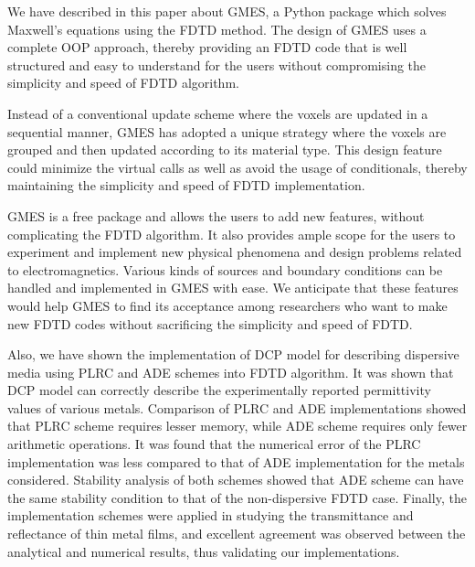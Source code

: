 
We have described in this paper about GMES, a Python package which solves Maxwell's equations using the FDTD method. The design of GMES uses a complete OOP approach, thereby providing an FDTD code that is well structured and easy to understand for the users without compromising the simplicity and speed of FDTD algorithm.

Instead of a conventional update scheme where the voxels are updated in a sequential manner, GMES has adopted a unique strategy where the voxels are grouped and then updated according to its material type. This design feature could minimize the virtual calls as well as avoid the usage of conditionals, thereby maintaining the simplicity and speed of FDTD implementation. 

GMES is a free package and allows the users to add new features, without complicating the FDTD algorithm. It also  provides ample scope for the users to experiment and implement new physical phenomena and design problems related to electromagnetics. Various kinds of sources and boundary conditions can be handled and implemented in GMES with ease. We anticipate that these features would help GMES to find its acceptance among researchers who want to make new FDTD codes without sacrificing the simplicity and speed of FDTD.

Also, we have shown the implementation of DCP model for describing dispersive media using PLRC and ADE schemes into FDTD algorithm. It was shown that DCP model can correctly describe the experimentally reported permittivity values of various metals. Comparison of PLRC and ADE implementations showed that PLRC scheme requires lesser memory, while ADE scheme requires only fewer arithmetic operations. It was found that the numerical error of the PLRC implementation was less compared to that of ADE implementation for the metals considered. Stability analysis of both schemes showed that ADE scheme can have the same stability condition to that of the non-dispersive FDTD case. Finally, the implementation schemes were applied in studying the transmittance and reflectance of thin metal films, and excellent agreement was observed between the analytical and numerical results, thus validating our implementations.
